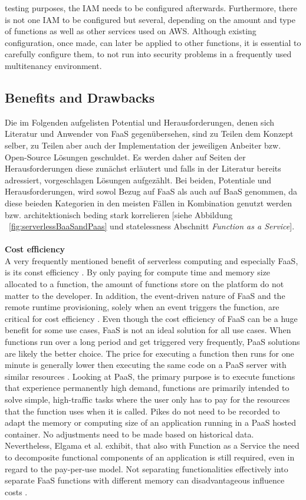 \documentclass[a4paper,twoside,11pt, pagesize]{scrartcl}
\begin{document}
\begin{spacing}{1.2}
testing purposes, the IAM needs to be configured afterwards. Furthermore, there is not one IAM to be configured but several, depending on the amount and type of functions as well as other services used on AWS. Although existing configuration, once made, can later be applied to other functions, it is essential to carefully configure them, to not run into security problems in a frequently used multitenancy environment.
\subsection{Benefits and Drawbacks}
Die im Folgenden aufgelisten Potential und Herausforderungen, denen sich Literatur und Anwender von FaaS gegenübersehen, sind zu Teilen dem Konzept selber, zu Teilen aber auch der Implementation der jeweiligen Anbeiter bzw. Open-Source Lösungen geschuldet. Es werden daher auf Seiten der Herausforderungen diese zunächst erläutert und falls in der Literatur bereits adressiert, vorgeschlagen Lösungen aufgezählt. Bei beiden, Potentiale und Herausforderungen, wird sowol Bezug auf FaaS als auch auf BaaS genommen, da diese beieden Kategorien in den meisten Fällen in Kombination genutzt werden bzw. architektionisch beding stark korrelieren [siehe Abbildung ~\ref{fig:serverlessBaaSandPaas} und \glqq statelessness\grqq{} Abschnitt \textit{Function as a Service}].\\\\ \textbf{Cost efficiency}\\ A very frequently mentioned benefit of serverless computing and especially FaaS, is its const efficiency \cite{lee2018evaluation}. By only paying for compute time and memory size allocated to a function, the amount of functions store on the platform do not matter to the developer. In addition, the event-driven nature of FaaS and the remote runtime provisioning, solely when an event triggers the function, are critical for cost efficiency \cite{feng2018exploring}. Even though the cost efficiency of FaaS can be a huge benefit for some use cases, FaaS is not an ideal solution for all use cases. When functions run over a long period and get triggered very frequently, PaaS solutions are likely the better choice. The price for executing a function then runs for one minute is generally lower then executing the same code on a PaaS server with similar resources \cite{jonas2019cloud}. Looking at PaaS, the primary purpose is to execute functions that experience permanently high demand, functions are primarily intended to solve simple, high-traffic tasks where the user only has to pay for the resources that the function uses when it is called. Pikes do not need to be recorded to adapt the memory or computing size of an application running in a PaaS hosted container. No adjustments need to be made based on historical data. Nevertheless, Elgama et al. exhibit, that also with Function as a Service the need to decomposite functional components of an application is still required, even in regard to the pay-per-use model. Not separating functionalities effectively into separate FaaS functions with different memory can disadvantageous influence costs \cite{elgamal2018costless}.\\\\ 
\end{spacing}
\end{document}
